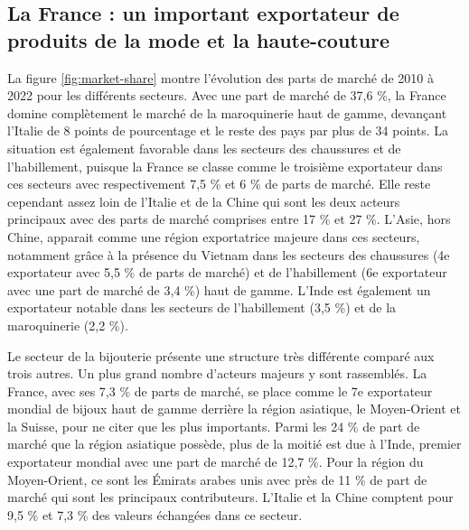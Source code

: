 \documentclass[french,10pt,a4paper]{article}
\begin{document}
\subsection{La France : un important exportateur de produits de la mode et la haute-couture}



La figure \ref{fig:market-share} montre l'évolution des parts de marché de 2010 à 2022 pour les différents secteurs. Avec une part de marché de 37,6 \%, la France domine complètement le marché de la maroquinerie haut de gamme, devançant l'Italie de 8 points de pourcentage et le reste des pays par plus de 34 points. La situation est également favorable dans les secteurs des chaussures et de l'habillement, puisque la France se classe comme le troisième exportateur dans ces secteurs avec respectivement 7,5 \% et 6 \% de parts de marché. Elle reste cependant assez loin de l'Italie et de la Chine qui sont les deux acteurs principaux avec des parts de marché comprises entre 17 \% et 27 \%. L'Asie, hors Chine, apparait comme une région exportatrice majeure dans ces secteurs, notamment grâce à la présence du Vietnam dans les secteurs des chaussures (4e exportateur avec 5,5 \% de parts de marché) et de l'habillement (6e exportateur avec une part de marché de 3,4 \%) haut de gamme. L'Inde est également un exportateur notable dans les secteurs de l'habillement (3,5 \%) et de la maroquinerie (2,2 \%).

Le secteur de la bijouterie présente une structure très différente comparé aux trois autres. Un plus grand nombre d'acteurs majeurs y sont rassemblés. La France, avec ses 7,3 \% de parts de marché, se place comme le 7e exportateur mondial de bijoux haut de gamme derrière la région asiatique, le Moyen-Orient et la Suisse, pour ne citer que les plus importants. Parmi les 24 \% de part de marché que la région asiatique possède, plus de la moitié est due à l'Inde, premier exportateur mondial avec une part de marché de 12,7 \%. Pour la région du Moyen-Orient, ce sont les Émirats arabes unis avec près de 11 \% de part de marché qui sont les principaux contributeurs. L'Italie et la Chine comptent pour 9,5 \% et 7,3 \% des valeurs échangées dans ce secteur.
\end{document}
